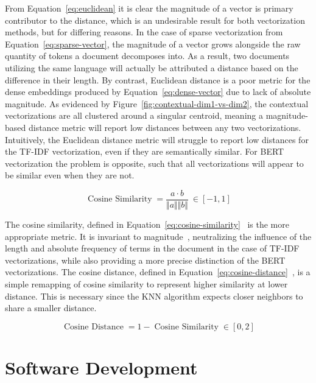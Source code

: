 \documentclass[11pt]{article}
\theoremstyle{plain}
\theoremstyle{definition}
\begin{document}
From Equation~\ref{eq:euclidean} it is clear the magnitude of a vector is primary contributor to the distance, which is an undesirable result for both vectorization methods, but for differing reasons. In the case of sparse vectorization from Equation~\ref{eq:sparse-vector}, the magnitude of a vector grows alongside the raw quantity of tokens a document decomposes into. As a result, two documents utilizing the same language will actually be attributed a distance based on the difference in their length. By contrast, Euclidean distance is a poor metric for the dense embeddings produced by Equation~\ref{eq:dense-vector} due to lack of absolute magnitude. As evidenced by Figure~\ref{fig:contextual-dim1-vs-dim2}, the contextual vectorizations are all clustered around a singular centroid, meaning a magnitude-based distance metric will report low distances between any two vectorizations. Intuitively, the Euclidean distance metric will struggle to report low distances for the TF-IDF vectorization, even if they are semantically similar. For BERT vectorization the problem is opposite, such that all vectorizations will appear to be similar even when they are not.

\begin{equation}\label{eq:cosine-similarity}
    \operatorname{Cosine\ Similarity} = \frac{a \cdot b}{\Vert a \Vert \Vert b \Vert}\ \in [-1, 1]
\end{equation}

The cosine similarity, defined in Equation~\ref{eq:cosine-similarity}~\cite{you/2025/semantics} is the more appropriate metric. It is invariant to magnitude~\cite{you/2025/semantics}, neutralizing the influence of the length and absolute frequency of terms in the document in the case of TF-IDF vectorizations, while also providing a more precise distinction of the BERT vectorizations. The cosine distance, defined in Equation~\ref{eq:cosine-distance}~\cite{you/2025/semantics}, is a simple remapping of cosine similarity to represent higher similarity at lower distance. This is necessary since the KNN algorithm expects closer neighbors to share a smaller distance.

\begin{equation}\label{eq:cosine-distance}
    \operatorname{Cosine\ Distance} = 1 -  \operatorname{Cosine\ Similarity} \in [0, 2]
\end{equation}

\section{Software Development}\label{sec:development}
\end{document}
